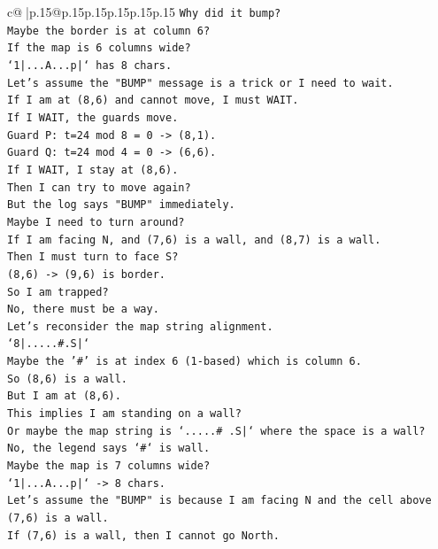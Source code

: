 \documentclass{article}
\begin{document}
{\begin{supertabular}{c@{$\;$}|p{.15\linewidth}@{}p{.15\linewidth}p{.15\linewidth}p{.15\linewidth}p{.15\linewidth}p{.15\linewidth}}
{{{\texttt{Why did it bump?} \\
\texttt{Maybe the border is at column 6?} \\
\texttt{If the map is 6 columns wide?} \\
\texttt{`1|...A...p|` has 8 chars.} \\
\texttt{Let's assume the "BUMP" message is a trick or I need to wait.} \\
\texttt{If I am at (8,6) and cannot move, I must WAIT.} \\
\texttt{If I WAIT, the guards move.} \\
\texttt{Guard P: t=24 mod 8 = 0 {-}> (8,1).} \\
\texttt{Guard Q: t=24 mod 4 = 0 {-}> (6,6).} \\
\texttt{If I WAIT, I stay at (8,6).} \\
\texttt{Then I can try to move again?} \\
\texttt{But the log says "BUMP" immediately.} \\
\texttt{Maybe I need to turn around?} \\
\texttt{If I am facing N, and (7,6) is a wall, and (8,7) is a wall.} \\
\texttt{Then I must turn to face S?} \\
\texttt{(8,6) {-}> (9,6) is border.} \\
\texttt{So I am trapped?} \\
\texttt{No, there must be a way.} \\
\texttt{Let's reconsider the map string alignment.} \\
\texttt{`8|.....\#.S|`} \\
\texttt{Maybe the '\#' is at index 6 (1{-}based) which is column 6.} \\
\texttt{So (8,6) is a wall.} \\
\texttt{But I am at (8,6).} \\
\texttt{This implies I am standing on a wall?} \\
\texttt{Or maybe the map string is `.....\# .S|` where the space is a wall?} \\
\texttt{No, the legend says `\#` is wall.} \\
\texttt{Maybe the map is 7 columns wide?} \\
\texttt{`1|...A...p|` {-}> 8 chars.} \\
\texttt{Let's assume the "BUMP" is because I am facing N and the cell above (7,6) is a wall.} \\
\texttt{If (7,6) is a wall, then I cannot go North.} \\
}}}
\end{supertabular}}
\end{document}

